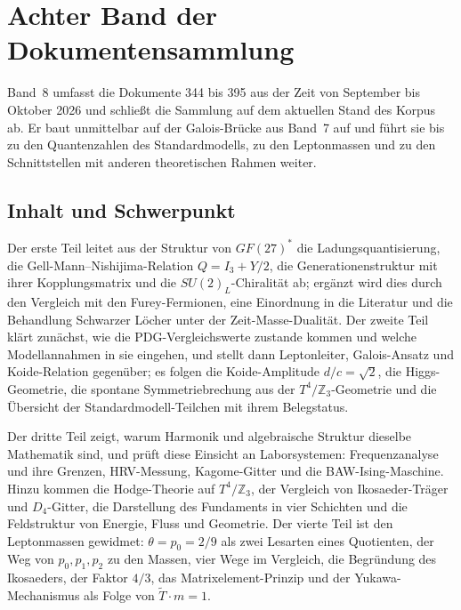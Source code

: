 
\section*{Achter Band der Dokumentensammlung}

Band~8 umfasst die Dokumente 344 bis 395 aus der Zeit von September bis
Oktober 2026 und schließt die Sammlung auf dem aktuellen Stand des
Korpus ab. Er baut unmittelbar auf der Galois-Brücke aus Band~7 auf und
führt sie bis zu den Quantenzahlen des Standardmodells, zu den Leptonmassen
und zu den Schnittstellen mit anderen theoretischen Rahmen weiter.

\subsection*{Inhalt und Schwerpunkt}

Der erste Teil leitet aus der Struktur von $GF(27)^*$ die
Ladungsquantisierung, die Gell-Mann--Nishijima-Relation
$Q=I_3+Y/2$, die Generationenstruktur mit ihrer Kopplungsmatrix und die
$SU(2)_L$-Chiralität ab; ergänzt wird dies durch den Vergleich mit den
Furey-Fermionen, eine Einordnung in die Literatur und die Behandlung
Schwarzer Löcher unter der Zeit-Masse-Dualität. Der zweite Teil klärt
zunächst, wie die PDG-Vergleichswerte zustande kommen und welche
Modellannahmen in sie eingehen, und stellt dann Leptonleiter, Galois-Ansatz
und Koide-Relation gegenüber; es folgen die Koide-Amplitude $d/c=\sqrt2$, die
Higgs-Geometrie, die spontane Symmetriebrechung aus der
$T^4/\mathbb{Z}_3$-Geometrie und die Übersicht der Standardmodell-Teilchen
mit ihrem Belegstatus.

Der dritte Teil zeigt, warum Harmonik und algebraische Struktur dieselbe
Mathematik sind, und prüft diese Einsicht an Laborsystemen: Frequenzanalyse
und ihre Grenzen, HRV-Messung, Kagome-Gitter und die BAW-Ising-Maschine.
Hinzu kommen die Hodge-Theorie auf $T^4/\mathbb{Z}_3$, der Vergleich von
Ikosaeder-Träger und $D_4$-Gitter, die Darstellung des Fundaments in vier
Schichten und die Feldstruktur von Energie, Fluss und Geometrie. Der vierte
Teil ist den Leptonmassen gewidmet: $\theta=p_0=2/9$ als zwei Lesarten eines
Quotienten, der Weg von $p_0,p_1,p_2$ zu den Massen, vier Wege im Vergleich,
die Begründung des Ikosaeders, der Faktor $4/3$, das Matrixelement-Prinzip
und der Yukawa-Mechanismus als Folge von $\tilde T\cdot m=1$.

